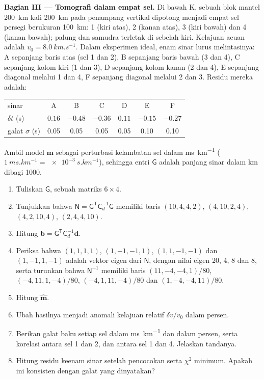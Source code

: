 \begin{problem}
\noindent\textbf{Bagian III --- Tomografi dalam empat sel.} Di bawah K, sebuah blok
mantel \qty{200}{km} kali \qty{200}{km} pada penampang vertikal dipotong menjadi empat
sel persegi berukuran \qty{100}{km}: 1 (kiri atas), 2 (kanan atas), 3 (kiri bawah)
dan 4 (kanan bawah); palung dan samudra terletak di sebelah kiri. Kelajuan acuan adalah $v_0 = \qty{8.0}{km.s^{-1}}$. Dalam
eksperimen ideal, enam sinar lurus melintasinya: A sepanjang baris atas (sel 1
dan 2), B sepanjang baris bawah (3 dan 4), C sepanjang kolom kiri (1 dan 3), D
sepanjang kolom kanan (2 dan 4), E sepanjang diagonal melalui 1 dan 4, F sepanjang
diagonal melalui 2 dan 3. Residu mereka adalah:
\begin{center}
\small
\begin{tabular}{lcccccc}
\hline
sinar & A & B & C & D & E & F \\
$\delta t$ (\unit{s}) & $0.16$ & $-0.48$ & $-0.36$ & $0.11$ & $-0.15$ & $-0.27$ \\
galat $\sigma$ (\unit{s}) & 0.05 & 0.05 & 0.05 & 0.05 & 0.10 & 0.10 \\
\hline
\end{tabular}
\end{center}
Ambil model $\mathbf m$ sebagai perturbasi kelambatan sel dalam
\unit{ms.km^{-1}} ($\qty{1}{ms.km^{-1}} = \qty{e-3}{s.km^{-1}}$), sehingga
entri $\mathsf G$ adalah panjang sinar dalam \unit{km} dibagi 1000.
\begin{enumerate}[resume]
  \item Tuliskan $\mathsf G$, sebuah matriks $6\times4$.
  \item Tunjukkan bahwa $\mathsf N = \mathsf G^{\mathsf T}\mathsf C_d^{-1}\mathsf G$
        memiliki baris $(10, 4, 4, 2)$, $(4, 10, 2, 4)$, $(4, 2, 10, 4)$,
        $(2, 4, 4, 10)$.
  \item Hitung $\mathbf b = \mathsf G^{\mathsf T}\mathsf C_d^{-1}\mathbf d$.
  \item Periksa bahwa $(1,1,1,1)$, $(1,-1,-1,1)$, $(1,1,-1,-1)$ dan $(1,-1,1,-1)$
        adalah vektor eigen dari $\mathsf N$, dengan nilai eigen 20, 4, 8 dan 8, serta
        turunkan bahwa $\mathsf N^{-1}$ memiliki baris $(11, -4, -4, 1)/80$,
        $(-4, 11, 1, -4)/80$, $(-4, 1, 11, -4)/80$ dan $(1, -4, -4, 11)/80$.
  \item Hitung  $\hat{\mathbf m}$.
  \item Ubah hasilnya menjadi anomali kelajuan relatif $\delta v/v_0$ dalam persen.
  \item Berikan galat baku setiap sel dalam \unit{ms.km^{-1}} dan dalam
        persen, serta korelasi antara sel 1 dan 2, dan antara sel 1
        dan 4. Jelaskan tandanya.
  \item Hitung residu keenam sinar setelah pencocokan serta
        $\chi^2$ minimum. Apakah ini konsisten dengan galat yang dinyatakan?
\end{enumerate}


\end{problem}
